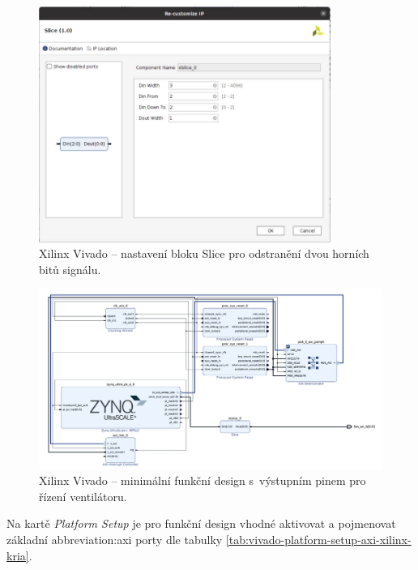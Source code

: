 \documentclass[a4paper, twoside, 11pt]{article}
\begin{document}
				\begin{figure}[htbp!]
					\centering
					\includegraphics[width=0.85\textwidth]{src/png/kr26-xilinx-vivado-flow/kr26-xilix-vivado-flow-29.jpg}
					\caption{Xilinx Vivado – nastavení bloku Slice pro odstranění dvou horních bitů signálu.}
					\label{fig:kr26-xilix-vivado-flow-29}
				\end{figure}

				\begin{figure}[htbp!]
					\centering
					\includegraphics[width=1\textwidth]{src/png/kr26-xilinx-vivado-flow/kr26-xilix-vivado-flow-31.jpg}
					\caption{Xilinx Vivado – minimální funkční design s~výstupním pinem pro řízení ventilátoru.}
					\label{fig:kr26-xilix-vivado-flow-31}
				\end{figure}


				Na kartě \textit{Platform Setup} je pro funkční design vhodné aktivovat a pojmenovat základní \gls{abbreviation:axi} porty dle tabulky \ref{tab:vivado-platform-setup-axi-xilinx-kria}.
\end{document}
